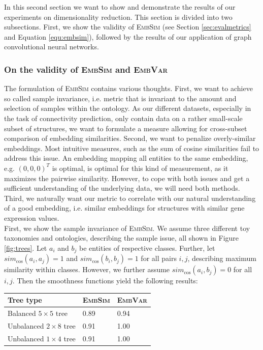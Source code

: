 \documentclass[]{article}
\begin{document}
In this second section we want to show and demonstrate the results of our experiments on dimensionality reduction. This section is divided into two subsections. First, we show the validity of \textsc{EmbSim} (see Section \ref{sec:evalmetrics} and Equation \ref{equ:embsim}), followed by the results of our application of graph convolutional neural networks.

\subsubsection{On the validity of \textsc{EmbSim} and \textsc{EmbVar}}
\label{sec:results_embsim}

The formulation of \textsc{EmbSim} contains various thoughts. First, we want to achieve so called sample invariance, i.e. metric that is invariant to the amount and selection of samples within the ontology. As our different datasets, especially in the task of connectivity prediction, only contain data on a rather small-scale subset of structures, we want to formulate a measure allowing for cross-subset comparison of embedding similarities. 
Second, we want to penalize overly-similar embeddings. Most intuitive measures, such as the sum of cosine similarities fail to address this issue. An embedding mapping all entities to the same embedding, e.g. $(0,0,0)^T$ is optimal, is optimal for this kind of measurement, as it maximizes the pairwise similarity. However, to cope with both issues and get a sufficient understanding of the underlying data, we will need both methods. Third, we naturally want our metric to correlate with our natural understanding of a good embedding, i.e. similar embeddings for structures with similar gene expression values.\\

First, we show the sample invariance of \textsc{EmbSim}. We assume three different toy taxonomies and ontologies, describing the sample issue, all shown in Figure \ref{fig:trees}. Let $a_i $  and $b_j$ be entities of respective classes. Further, let $sim_\text{cos}(a_i, a_j)=1$ and $sim_\text{cos}(b_i, b_j)=1$ for all pairs $i,j$, describing maximum similarity within classes. However, we further assume $sim_\text{cos}(a_i, b_j)=0$ for all $i,j$. Then the smoothness functions yield the following results:\\

{
\centering
\renewcommand{\arraystretch}{1.5}
\hspace{3cm}\begin{tabular}{l|ll}
	Tree type& \textsc{EmbSim} & \textsc{EmbVar}\\
	\hline
	Balanced $5\times 5$ tree&0.89&0.94\\
	Unbalanced $2\times 8$ tree&0.91&1.00\\
	Unbalanced $1\times 4$ tree&0.91&1.00\\
\end{tabular}
}\\
\end{document}
